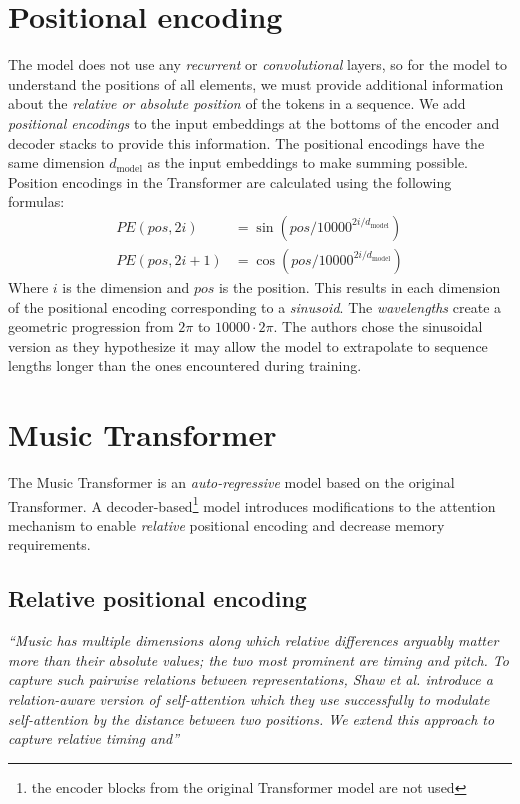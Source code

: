 \section{Positional encoding}\label{sec:positional-encoding}

The model does not use any \textit{recurrent} or \textit{convolutional} layers, so for the model to understand the positions of all elements, we must provide additional information about the \textit{relative or absolute position} of the tokens in a sequence.
We add \textit{positional encodings} to the input embeddings at the bottoms of the encoder and decoder stacks to provide this information.
The positional encodings have the same dimension $d_{\text{model}}$ as the input embeddings to make summing possible.~\cite{attention-is-all-you-need}
Position encodings in the Transformer are calculated using the following formulas:
\begin{align*}
    PE(pos,2i) &= \sin (pos/10000^{2i/d_{\text{model}}}) \\
    PE(pos,2i+1) &= \cos (pos/10000^{2i/d_{\text{model}}})
\end{align*}
Where $i$ is the dimension and $pos$ is the position.
This results in each dimension of the positional encoding corresponding to a \textit{sinusoid}.
The \textit{wavelengths} create a geometric progression from $2\pi$ to $10000 \cdot 2\pi$.
The authors chose the sinusoidal version as they hypothesize it may allow the model to extrapolate to sequence lengths longer than the ones encountered during training.~\cite{attention-is-all-you-need}


\section{Music Transformer}\label{sec:music-transformer}

The Music Transformer is an \textit{auto-regressive} model based on the original Transformer.
A decoder-based\footnote{the encoder blocks from the original Transformer model are not used} model introduces modifications to the attention mechanism to enable \textit{relative} positional encoding and decrease memory requirements.~\cite{music-transformer}

\subsection{Relative positional encoding}\label{subsec:relative-positional-encoding}

\textit{``Music has multiple dimensions along which relative differences arguably matter more than their absolute values;
the two most prominent are timing and pitch.
To capture such pairwise relations between representations, Shaw et al.\cite{relative-positions} introduce a relation-aware version of self-attention which they use successfully to modulate self-attention by the distance between two positions.
We extend this approach to capture relative timing and''}~\cite{music-transformer}

